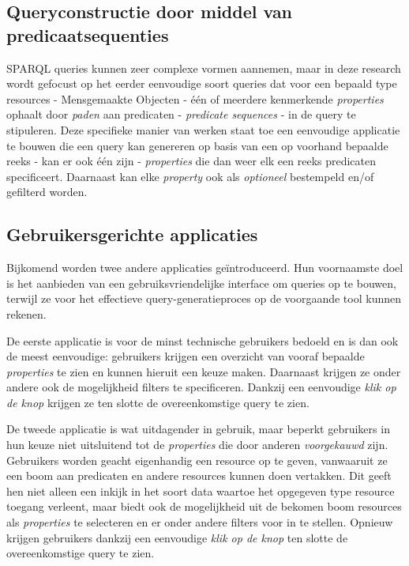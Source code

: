 \documentclass[conference]{IEEEtran}
\begin{document}
\subsection{Queryconstructie door middel van predicaatsequenties}
SPARQL queries kunnen zeer complexe vormen aannemen, maar in deze research wordt gefocust op het eerder eenvoudige soort queries dat voor een bepaald type resources - Mensgemaakte Objecten - één of meerdere kenmerkende \textit{properties} ophaalt door \textit{paden} aan predicaten - \textit{predicate sequences} - in de query te stipuleren. Deze specifieke manier van werken staat toe een eenvoudige applicatie te bouwen die een query kan genereren op basis van een op voorhand bepaalde reeks - kan er ook één zijn - \textit{properties} die dan weer elk een reeks predicaten specificeert. Daarnaast kan elke \textit{property} ook als \textit{optioneel} bestempeld en/of gefilterd worden.

\subsection{Gebruikersgerichte applicaties}
Bijkomend worden twee andere applicaties geïntroduceerd. Hun voornaamste doel is het aanbieden van een gebruiksvriendelijke interface om queries op te bouwen, terwijl ze voor het effectieve query-generatieproces op de voorgaande tool kunnen rekenen.

De eerste applicatie is voor de minst technische gebruikers bedoeld en is dan ook de meest eenvoudige: gebruikers krijgen een overzicht van vooraf bepaalde \textit{properties} te zien en kunnen hieruit een keuze maken. Daarnaast krijgen ze onder andere ook de mogelijkheid filters te specificeren. Dankzij een eenvoudige \textit{klik op de knop} krijgen ze ten slotte de overeenkomstige query te zien.

De tweede applicatie is wat uitdagender in gebruik, maar beperkt gebruikers in hun keuze niet uitsluitend tot de \textit{properties} die door anderen \textit{voorgekauwd} zijn. Gebruikers worden geacht eigenhandig een resource op te geven, vanwaaruit ze een boom aan predicaten en andere resources kunnen doen vertakken. Dit geeft hen niet alleen een inkijk in het soort data waartoe het opgegeven type resource toegang verleent, maar biedt ook de mogelijkheid uit de bekomen boom resources als \textit{properties} te selecteren en er onder andere filters voor in te stellen. Opnieuw krijgen gebruikers dankzij een eenvoudige \textit{klik op de knop} ten slotte de overeenkomstige query te zien.
\end{document}
